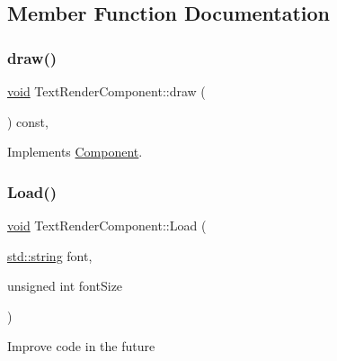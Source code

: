 \subsection{Member Function Documentation}
\mbox{\label{classTextRenderComponent_adb02fc97e8e67e7d3035b38c2860bfab}} 
\subsubsection{\texorpdfstring{draw()}{draw()}}
{\footnotesize\ttfamily \hyperlink{imgui__impl__opengl3__loader_8h_ac668e7cffd9e2e9cfee428b9b2f34fa7}{void} Text\+Render\+Component\+::draw (\begin{DoxyParamCaption}{ }\end{DoxyParamCaption}) const\hspace{0.3cm}{\ttfamily [override]}, {\ttfamily [virtual]}}



Implements \hyperlink{classComponent_a8f45309003f02191f2bcc8864e8e9ecf}{Component}.

\mbox{\label{classTextRenderComponent_a5e1f85aded3b9c661483b62984c675d1}} 
\subsubsection{\texorpdfstring{Load()}{Load()}}
{\footnotesize\ttfamily \hyperlink{imgui__impl__opengl3__loader_8h_ac668e7cffd9e2e9cfee428b9b2f34fa7}{void} Text\+Render\+Component\+::\+Load (\begin{DoxyParamCaption}\item[{\hyperlink{imgui__impl__opengl3__loader_8h_ac83513893df92266f79a515488701770}{std\+::string}}]{font,  }\item[{unsigned int}]{font\+Size }\end{DoxyParamCaption})}

Improve code in the future \mbox{\label{classTextRenderComponent_aafaf33608a83d1ff4af66ef53ba81b29}} 
